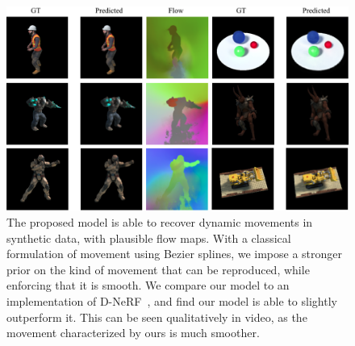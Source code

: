 \documentclass[10pt,twocolumn,letterpaper]{article}
\begin{document}
\begin{figure}
    \centering
    \includegraphics[width=\textwidth]{teaser}
    \caption{The proposed model is able to recover dynamic movements in synthetic data, with plausible flow maps. With a classical formulation of movement using Bezier splines, we impose a stronger prior on the kind of movement that can be reproduced, while enforcing that it is smooth. We compare our model to an implementation of D-NeRF~\cite{pumarola2020dnerf}, and find our model is able to slightly outperform it. This can be seen qualitatively in video, as the movement characterized by ours is much smoother.}
    \label{fig:intro_figure}
\end{figure}








{\small
    
    
}
\end{document}

